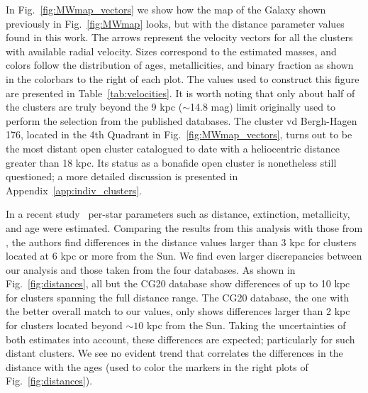 \documentclass{aa}
\begin{document}
  In Fig.~\ref{fig:MWmap_vectors} we show how the map of the Galaxy shown
  previously in Fig.~\ref{fig:MWmap} looks, but with the distance parameter
  values found in this work. The arrows represent the velocity vectors for all
  the clusters with available radial velocity. Sizes correspond to the estimated
  masses, and colors follow the distribution of ages, metallicities, and binary
  fraction as shown in the colorbars to the right of each plot. The values used
  to construct this figure are presented in Table~\ref{tab:velocities}.
  It is worth noting that only about half of the clusters are truly beyond the 9
  kpc ($\sim$14.8 mag) limit originally used to perform the selection from the
  published databases.
  The cluster vd Bergh-Hagen 176, located in the 4th Quadrant
  in Fig.~\ref{fig:MWmap_vectors}, turns out to be the most distant open cluster
  catalogued to date with a heliocentric distance greater than 18 kpc. Its
  status as a bonafide open cluster is nonetheless still questioned; a more
  detailed discussion is presented in Appendix~\ref{app:indiv_clusters}.

  \begin{figure*}
   \caption{Same as Fig.~\ref{fig:MWmap} but showing the positions given by our
   analysis with \texttt{ASteCA}. The velocity vectors are drawn for those
   clusters with available radial velocities. The length of the vectors are
   proportional to the velocity modules in each 2D projection. Sizes follow
   masses and colors follow ages, metallicities, and binary fractions, for the
   left, top right, and bottom right plots, respectively.}
   \label{fig:MWmap_vectors}
  \end{figure*}

  In a recent study~\citep{Anders_2022} per-star parameters such as distance,
  extinction, metallicity, and age were estimated. Comparing the results
  from this analysis with those from \cite{Cantat_2020}, the authors find
  differences in the distance values larger than 3 kpc for clusters located at
  6 kpc or more from the Sun. We find even larger discrepancies between our
  analysis and those taken from the four databases. As shown in
  Fig.~\ref{fig:distances}, all but the CG20 database show differences of up
  to 10 kpc for clusters spanning the full distance range. The CG20
  database, the one with the better overall match to our values, only
  shows differences larger than 2 kpc for clusters located beyond
  $\sim10$ kpc from the Sun. Taking the uncertainties of both estimates
  into account, these differences are expected; particularly for such distant
  clusters.
  We see no evident trend that correlates the differences in the distance with
  the ages (used to color the markers in the right plots of
  Fig.~\ref{fig:distances}).\\
\end{document}
